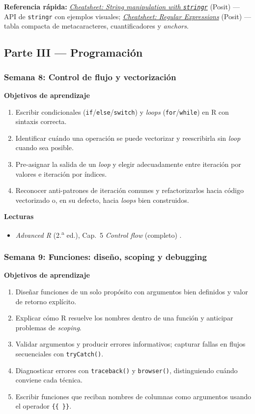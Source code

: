 \documentclass[11pt,letterpaper]{article}
\newcommand{\semana}[2]{%
  \subsubsection*{\color{main}Semana #1: #2}%
}
\newcommand{\cheatsheet}[2]{%
  \href{https://rstudio.github.io/cheatsheets/#1.pdf}{\textit{Cheatsheet: #2}}%
}
\begin{document}
\medskip
\noindent\textbf{Referencia rápida:} \cheatsheet{strings}{String manipulation with \texttt{stringr}} (Posit) ---API de \texttt{stringr} con ejemplos visuales; \cheatsheet{regex}{Regular Expressions} (Posit) ---tabla compacta de metacaracteres, cuantificadores y \textit{anchors}.

\subsection*{\color{main}Parte III --- Programación}

\semana{8}{Control de flujo y vectorización}

\medskip
\noindent\textbf{Objetivos de aprendizaje}
\begin{enumerate}[leftmargin=*, itemsep=1pt]
    \item Escribir condicionales (\texttt{if}/\texttt{else}/\texttt{switch}) y \textit{loops} (\texttt{for}/\texttt{while}) en R con sintaxis correcta.
    \item Identificar cuándo una operación se puede vectorizar y reescribirla sin \textit{loop} cuando sea posible.
    \item Pre-asignar la salida de un \textit{loop} y elegir adecuadamente entre iteración por valores e iteración por índices.
    \item Reconocer anti-patrones de iteración comunes y refactorizarlos hacia código vectorizado o, en su defecto, hacia \textit{loops} bien construidos.
\end{enumerate}

\medskip
\noindent\textbf{Lecturas}
\begin{itemize}[leftmargin=*, itemsep=1pt]
    \item \textit{Advanced R} (2.\textsuperscript{a} ed.), Cap.\ 5 \textit{Control flow} (completo) \cite{wickham2019advr}.
\end{itemize}

\semana{9}{Funciones: diseño, scoping y debugging}

\medskip
\noindent\textbf{Objetivos de aprendizaje}
\begin{enumerate}[leftmargin=*, itemsep=1pt]
    \item Diseñar funciones de un solo propósito con argumentos bien definidos y valor de retorno explícito.
    \item Explicar cómo R resuelve los nombres dentro de una función y anticipar problemas de \textit{scoping}.
    \item Validar argumentos y producir errores informativos; capturar fallas en flujos secuenciales con \texttt{tryCatch()}.
    \item Diagnosticar errores con \texttt{traceback()} y \texttt{browser()}, distinguiendo cuándo conviene cada técnica.
    \item Escribir funciones que reciban nombres de columnas como argumentos usando el operador \texttt{\{\{~\}\}}.
\end{enumerate}
\end{document}
